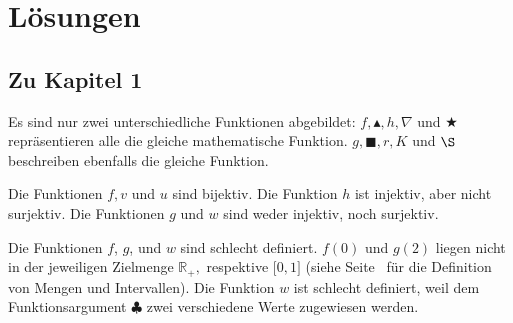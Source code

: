 \documentclass[12pt]{article}
\begin{document}
\section{Lösungen}
\subsection{Zu Kapitel 1}
\begin{solution}%
Es sind nur zwei unterschiedliche Funktionen abgebildet: $f, \blacktriangle, h, \nabla$ und $\bigstar$ repräsentieren alle die gleiche mathematische Funktion.
$g, \blacksquare, r, K$ und $\S$ beschreiben ebenfalls die gleiche Funktion.
\end{solution}

\begin{solution}
Die Funktionen $f, v$ und $u$ sind bijektiv. Die Funktion $h$ ist injektiv, aber nicht surjektiv. Die Funktionen $g$ und $w$ sind weder injektiv, noch surjektiv.
\end{solution}

\begin{solution}
Die Funktionen $f$, $g$, und $w$ sind schlecht definiert. $f(0)$ und $g(2)$ liegen nicht in der jeweiligen Zielmenge $\mathbb{R}_{+},$ respektive $\lbrack 0, 1 \rbrack$ (siehe Seite~\pageref{terminologie} für die Definition von Mengen und Intervallen). Die Funktion $w$ ist schlecht definiert, weil dem Funktionsargument $\clubsuit$ zwei verschiedene Werte zugewiesen werden.
\end{solution}
\end{document}
